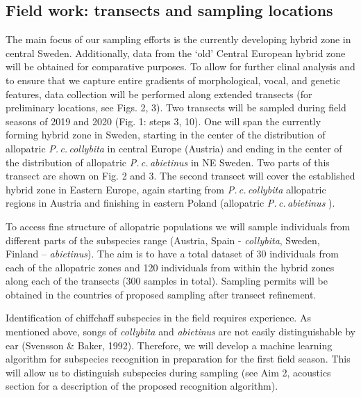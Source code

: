\documentclass[11pt,a4paper]{article}
\begin{document}
\subsection{Field work: transects and sampling locations}
The main focus of our sampling efforts is the currently developing hybrid zone in central Sweden. Additionally, data from the ‘old’ Central European hybrid zone will be obtained for comparative purposes. To allow for further clinal analysis and to ensure that we capture entire gradients of morphological, vocal, and genetic features, data collection will be performed along extended transects (for preliminary locations, see Figs. 2, 3). Two transects will be sampled during field seasons of 2019 and 2020 (Fig. 1: steps 3, 10). One will span the currently forming hybrid zone in Sweden, starting in the center of the distribution of allopatric \textit{P.\,c.\,collybita} in central Europe (Austria) and ending in the center of the distribution of allopatric \textit{P.\,c.\,abietinus} in NE Sweden. Two parts of this transect are shown on Fig. 2 and 3. The second transect will cover the established hybrid zone in Eastern Europe, again starting from \textit{P.\,c.\,collybita}  allopatric regions in Austria and finishing in eastern Poland (allopatric \textit{P.\,c.\,abietinus} ).

To access fine structure of allopatric populations we will sample individuals from different parts of the subspecies range (Austria, Spain - \textit{collybita}, Sweden, Finland – \textit{abietinus}). The aim is to have a total dataset of 30 individuals from each of the allopatric zones and 120 individuals from within the hybrid zones along each of the transects (300 samples in total). Sampling permits will be obtained in the countries of proposed sampling after transect refinement.  

Identification of chiffchaff subspecies in the field requires experience. As mentioned above, songs of \textit{collybita} and \textit{abietinus} are not easily distinguishable by ear (Svensson \& Baker, 1992). Therefore, we will develop a machine learning algorithm for subspecies recognition in preparation for the first field season. This will allow us to distinguish subspecies during sampling (see Aim 2, acoustics section for a description of the proposed recognition algorithm). 
\end{document}
